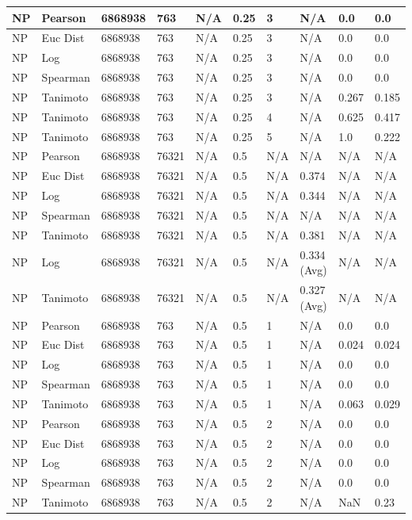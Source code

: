 \documentclass{article}
\begin{document}
\begin{longtable}{ |p{1.7cm}|p{1.9cm}|p{1.5cm}|p{1.5cm}|p{0.75cm}|p{0.75cm}|p{0.75cm}|p{0.75cm}|p{1.5cm}|p{1.5cm}|}
    NP & Pearson & 6868938 & 763 & N/A &  0.25 & 3 & N/A & 0.0 & 0.0  \\ \hline
    NP & Euc Dist & 6868938 & 763 & N/A &  0.25 & 3  & N/A &0.0 & 0.0   \\ \hline
    NP & Log & 6868938 & 763 & N/A &  0.25 & 3  & N/A & 0.0 & 0.0  \\ \hline
    NP & Spearman & 6868938 & 763 & N/A &  0.25 & 3  & N/A &0.0 & 0.0 \\ \hline
    NP & Tanimoto & 6868938 & 763 & N/A &  0.25 & 3 & N/A & 0.267 & 0.185 \\ \hline
    NP & Tanimoto & 6868938 & 763 & N/A &  0.25 &  4 & N/A & 0.625 & 0.417 \\ \hline
    NP & Tanimoto & 6868938 & 763 & N/A &  0.25 &  5 & N/A & 1.0 & 0.222 \\ \hline
    
    NP & Pearson & 6868938 & 76321 & N/A &  0.5 & N/A & N/A & N/A & N/A  \\ \hline
    NP & Euc Dist & 6868938 & 76321 & N/A &  0.5 & N/A & 0.374 & N/A & N/A   \\ \hline
    NP & Log & 6868938 & 76321 & N/A &  0.5 & N/A & 0.344 & N/A & N/A  \\ \hline
    NP & Spearman & 6868938 & 76321 & N/A &  0.5 & N/A & N/A & N/A & N/A \\ \hline
    NP & Tanimoto & 6868938 & 76321 & N/A &  0.5 & N/A & 0.381 & N/A & N/A \\ \hline
    NP & Log & 6868938 & 76321 & N/A &  0.5 & N/A & 0.334 (Avg) & N/A & N/A \\ \hline
    NP & Tanimoto & 6868938 & 76321 & N/A &  0.5 & N/A & 0.327 (Avg) & N/A & N/A \\ \hline
    
    NP & Pearson & 6868938 & 763 & N/A &  0.5  & 1 & N/A & 0.0 & 0.0  \\ \hline
    NP & Euc Dist & 6868938 & 763 & N/A &  0.5  & 1 & N/A &0.024 & 0.024   \\ \hline
    NP & Log & 6868938 & 763 & N/A &  0.5  & 1 & N/A & 0.0 & 0.0  \\ \hline
    NP & Spearman & 6868938 & 763 & N/A &  0.5  & 1 & N/A &0.0 & 0.0 \\ \hline
    NP & Tanimoto & 6868938 & 763 & N/A &  0.5  & 1 & N/A & 0.063 & 0.029 \\ \hline
    
    NP & Pearson & 6868938 & 763 & N/A &  0.5  & 2 & N/A & 0.0 & 0.0  \\ \hline
    NP & Euc Dist & 6868938 & 763 & N/A &  0.5  &  2 & N/A &0.0 & 0.0   \\ \hline
    NP & Log & 6868938 & 763 & N/A &  0.5  &  2 & N/A & 0.0 & 0.0 \\ \hline
    NP & Spearman & 6868938 & 763 & N/A &  0.5  &  2 & N/A & 0.0 & 0.0 \\ \hline
    NP & Tanimoto & 6868938 & 763 & N/A &  0.5  &  2 & N/A & NaN & 0.23 \\ \hline
    

\end{longtable}
\end{document}
